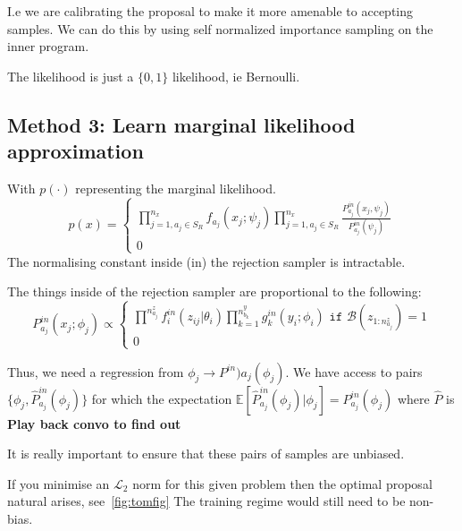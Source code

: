 \documentclass{article}
\begin{document}
I.e we are calibrating the proposal to make it more amenable to accepting samples. 
We can do this by using self normalized importance sampling on the inner program. 

The likelihood is just a $\{0,1\}$ likelihood, ie Bernoulli. 

\subsection{Method 3: Learn marginal likelihood approximation}
With $ p(\cdot)$ representing the marginal likelihood. 
\begin{equation}
  p(x) = 
  \begin{cases}
  \prod^{n_x}_{j=1,{a_j}\in S_{R}} f_{a_j}(x_j ; \psi_j) \prod^{n_x}_{j=1,{a_j}\in S_{R}} \frac{P^{in}_{a_j}(x_j,\psi_j)}{P^{in}_{a_j}(\psi_j)} \\
  0
  \end{cases}
\end{equation}
The normalising constant inside (in) the rejection sampler is intractable. 

The things inside of the rejection sampler are proportional to the following:
\begin{equation}
  P_{a_j}^{in}(x_j ; \phi_j) \propto
  \begin{cases}
  \prod^{n^{z}_{a_j}} f^{in}_{i}(z_{ij} | \theta_i) \prod_{k=1}^{n^{y}_{b_k}}g^{in}_{k}(y_i ; \phi_{i}) \texttt{ if } \mathcal{B}(z_{1:n^{z}_{a_j}}) = 1 \\
  0
  \end{cases}
\end{equation}

Thus, we need a regression from $\phi_j \rightarrow P^{in}){a_j}(\phi_j) $.
We have access to pairs $\{\phi_j, \hat{P}^{in}_{a_j}(\phi_j)\}$ for which 
the expectation $\mathbb{E}[\hat{P}^{in}_{a_j}( \phi_j)| \phi_j] = P^{in}_{a_j} (\phi_j)$ where
$\hat{P}$ is \textbf{Play back convo to find out}

It is really important to ensure that these pairs of samples are unbiased. 

If you minimise an $\mathcal{L}_2$ norm for this given problem then the optimal proposal natural arises, see~\ref{fig:tomfig} 
The training regime would still need to be non-bias. 
\end{document}
